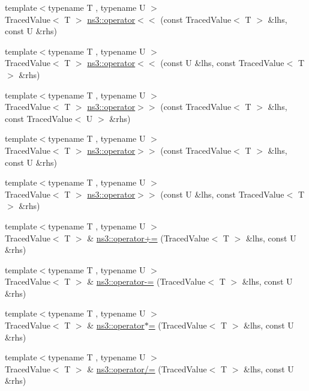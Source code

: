 \begin{DoxyCompactItemize}
\item 
{\footnotesize template$<$typename T , typename U $>$ }\\Traced\+Value$<$ T $>$ \hyperlink{group__tracing_ga55f6e82af35179ce2f5d47dde1fc1b0d}{ns3\+::operator$<$$<$} (const Traced\+Value$<$ T $>$ \&lhs, const U \&rhs)
\item 
{\footnotesize template$<$typename T , typename U $>$ }\\Traced\+Value$<$ T $>$ \hyperlink{group__tracing_gaebb15626a525de5701cea5dac0239c4e}{ns3\+::operator$<$$<$} (const U \&lhs, const Traced\+Value$<$ T $>$ \&rhs)
\item 
{\footnotesize template$<$typename T , typename U $>$ }\\Traced\+Value$<$ T $>$ \hyperlink{group__tracing_gab18fddbeebddf61b662f4b07cecee4d2}{ns3\+::operator$>$$>$} (const Traced\+Value$<$ T $>$ \&lhs, const Traced\+Value$<$ U $>$ \&rhs)
\item 
{\footnotesize template$<$typename T , typename U $>$ }\\Traced\+Value$<$ T $>$ \hyperlink{group__tracing_gab458d5235e4f4b5831819008b3a1bf57}{ns3\+::operator$>$$>$} (const Traced\+Value$<$ T $>$ \&lhs, const U \&rhs)
\item 
{\footnotesize template$<$typename T , typename U $>$ }\\Traced\+Value$<$ T $>$ \hyperlink{group__tracing_ga83fb7bddcd05424864a3ef8465362747}{ns3\+::operator$>$$>$} (const U \&lhs, const Traced\+Value$<$ T $>$ \&rhs)
\item 
{\footnotesize template$<$typename T , typename U $>$ }\\Traced\+Value$<$ T $>$ \& \hyperlink{group__tracing_ga9323132fbeca95f9d5c917c72212aa06}{ns3\+::operator+=} (Traced\+Value$<$ T $>$ \&lhs, const U \&rhs)
\item 
{\footnotesize template$<$typename T , typename U $>$ }\\Traced\+Value$<$ T $>$ \& \hyperlink{group__tracing_ga4457592ace84e2565e8800a00e4d3b01}{ns3\+::operator-\/=} (Traced\+Value$<$ T $>$ \&lhs, const U \&rhs)
\item 
{\footnotesize template$<$typename T , typename U $>$ }\\Traced\+Value$<$ T $>$ \& \hyperlink{group__tracing_ga6b5e77408427fc66a81b3668f74f2d3f}{ns3\+::operator$\ast$=} (Traced\+Value$<$ T $>$ \&lhs, const U \&rhs)
\item 
{\footnotesize template$<$typename T , typename U $>$ }\\Traced\+Value$<$ T $>$ \& \hyperlink{group__tracing_gab12fa7a2a5815f5ec54c156f5d9b8f3d}{ns3\+::operator/=} (Traced\+Value$<$ T $>$ \&lhs, const U \&rhs)

\end{DoxyCompactItemize}
